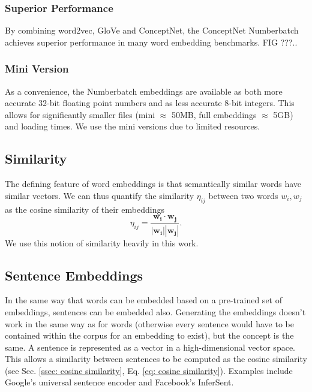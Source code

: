         \subsubsection{Superior Performance}
            By combining word2vec, GloVe and ConceptNet, the ConceptNet Numberbatch achieves superior performance in many word embedding benchmarks. FIG ???.\cite{speer2017conceptnet, conceptnetPerformance}.
        
        \subsubsection{Mini Version}
            As a convenience, the Numberbatch embeddings are available as both more accurate 32-bit floating point numbers and as less accurate 8-bit integers. This allows for significantly smaller files (mini $\approx$ 50MB, full embeddings $\approx$ 5GB) and loading times. We use the mini versions due to limited resources.
        
    \subsection{Similarity \label{ssec: cosine similarity}} 
        The defining feature of word embeddings is that semantically similar words have similar vectors. We can thus quantify the similarity $\eta_{ij}$ between two words $w_i, w_j$ as the cosine similarity of their embeddings
        \begin{equation}
            \eta_{ij} = \frac{\mathbf{w_i} \cdot \mathbf{w_j}}{|\mathbf{w_i}| |\mathbf{w_j}|}.
            \label{eq: cosine similarity}
        \end{equation}
        We use this notion of similarity heavily in this work.
    
    \subsection{Sentence Embeddings \label{ssec: utterance embeddings}}
    
    In the same way that words can be embedded based on a pre-trained set of embeddings, sentences can be embedded also. Generating the embeddings doesn't work in the same way as for words (otherwise every sentence would have to be contained within the corpus for an embedding to exist), but the concept is the same. A sentence is represented as a vector in a high-dimensional vector space. This allows a similarity between sentences to be computed as the cosine similarity (see Sec. \ref{ssec: cosine similarity}, Eq. \ref{eq: cosine similarity}). Examples include Google's universal sentence encoder\cite{GoogleEncoder} and Facebook's InferSent\cite{infersent}.
     
